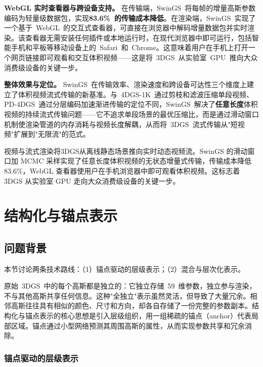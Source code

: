 \smallskip\noindent\textbf{WebGL 实时查看器与跨设备支持。}
在传输端，SwinGS~将每帧的增量高斯参数编码为轻量级数据包，实现\textbf{83.6\%~的传输成本降低}。在渲染端，SwinGS~实现了一个基于~WebGL~的交互式查看器，可直接在浏览器中解码增量数据包并实时渲染。该查看器无需安装任何插件或本地运行时，在现代浏览器中即可运行，包括智能手机和平板等移动设备上的~Safari~和~Chrome。这意味着用户在手机上打开一个网页链接即可观看和交互体积视频——这是将~3DGS~从实验室~GPU~推向大众消费级设备的关键一步。

\smallskip\noindent\textbf{整体效果与定位。}
SwinGS~在传输效率、渲染速度和跨设备可达性三个维度上建立了体积视频流式传输的新基准。与~4DGS-1K~通过剪枝和滤波压缩单段视频、PD-4DGS~通过分层编码加速渐进传输的定位不同，SwinGS~解决了\textbf{任意长度}体积视频的持续流式传输问题——它不追求单段场景的最优压缩比，而是通过滑动窗口机制使渲染管道的内存消耗与视频长度解耦，从而将~3DGS~流式传输从"短视频"扩展到"无限流"的范式。

\begin{takeaway}
视频与流式渲染将3DGS从离线静态场景推向实时动态视频流。SwinGS 的滑动窗口加 MCMC 采样实现了任意长度体积视频的无状态增量式传输，传输成本降低 83.6\%，WebGL 查看器使用户在手机浏览器中即可观看体积视频。这标志着 3DGS 从实验室 GPU 走向大众消费级设备的关键一步。
\end{takeaway}


\section{结构化与锚点表示}
\label{sec:11_5}

\subsection{问题背景}

本节讨论两条技术路线：（1）锚点驱动的层级表示；（2）混合与层次化表示。

原始~3DGS~中的每个高斯都是独立的：它独立存储~59~维参数，独立参与渲染，不与其他高斯共享任何信息。这种"全独立"表示虽然灵活，但导致了大量冗余。相邻高斯往往具有相似的颜色、尺寸和方向，却各自存储了一份完整的参数副本。结构化与锚点表示的核心思想是引入层级组织，用一组稀疏的锚点（anchor）代表局部区域。锚点通过小型网络预测其周围高斯的属性，从而实现参数共享和冗余消除。

\subsubsection{锚点驱动的层级表示}

